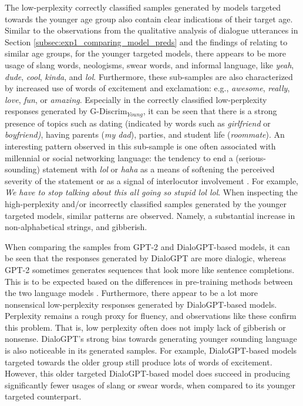 The low-perplexity correctly classified samples generated by models targeted towards the younger age group also contain clear indications of their target age. Similar to the observations from the qualitative analysis of dialogue utterances in Section \ref{subsec:exp1_comparing_model_preds} and the findings of \cite{schler2006effects} relating to similar age groups, for the younger targeted models, there appears to be more usage of slang words, neologisms, swear words, and informal language, like \textit{yeah}, \textit{dude}, \textit{cool}, \textit{kinda}, and \textit{lol}. 
Furthermore, these sub-samples are also characterized by increased use of words of excitement and exclamation: e.g., \textit{awesome}, \textit{really}, \textit{love}, \textit{fun}, or \textit{amazing}. Especially in the correctly classified low-perplexity responses generated by G-Discrim$_{Young}$, it can be seen that there is a strong presence of topics such as dating (indicated by words such as \textit{girlfriend} or \textit{boyfriend)}, having parents (\textit{my dad}), parties, and student life (\textit{roommate}). An interesting pattern observed in this sub-sample is one often associated with millennial or social networking language: the tendency to end a (serious-sounding) statement with \textit{lol} or \textit{haha} as a means of softening the perceived severity of the statement or as a signal of interlocutor involvement \citep{newitz2019you, tagliamonte2008linguistic}. For example, \textit{We have to stop talking about this all going so stupid lol lol}. When inspecting the high-perplexity and/or incorrectly classified samples generated by the younger targeted models, similar patterns are observed. Namely, a substantial increase in non-alphabetical strings, and gibberish.

When comparing the samples from GPT-2 and DialoGPT-based models, it can be seen that the responses generated by DialoGPT are more dialogic, whereas GPT-2 sometimes generates sequences that look more like sentence completions. This is to be expected based on the differences in pre-training methods between the two language models \citep{zhang2019dialogpt}. Furthermore, there appear to be a lot more nonsensical low-perplexity responses generated by DialoGPT-based models. Perplexity remains a rough proxy for fluency, and observations like these confirm this problem. That is, low perplexity often does not imply lack of gibberish or nonsense. DialoGPT's strong bias towards generating younger sounding language is also noticeable in its generated samples. For example, DialoGPT-based models targeted towards the older group still produce lots of words of excitement. However, this older targeted DialoGPT-based model does succeed in producing significantly fewer usages of slang or swear words, when compared to its younger targeted counterpart.


